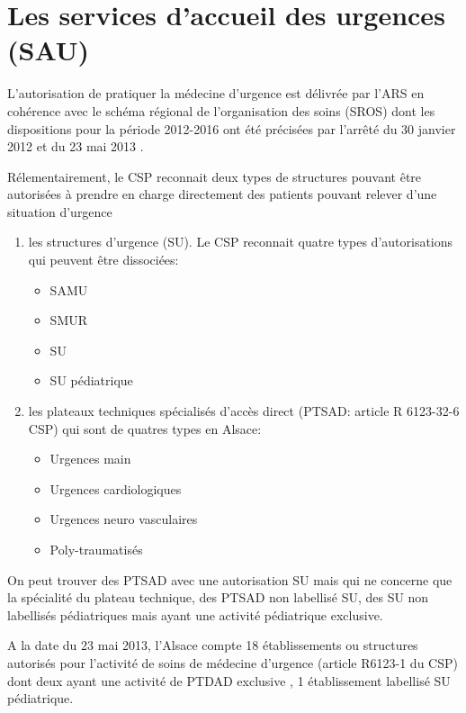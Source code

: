 \documentclass[12pt,english,french,twoside]{report}\usepackage[]{graphicx}\usepackage[]{color}
\begin{document}
\section{Les services d'accueil des urgences (SAU)}

L'autorisation de pratiquer la médecine d'urgence est délivrée par l'ARS en cohérence avec le schéma régional de l'organisation des soins (SROS) dont les dispositions pour la période 2012-2016 ont été précisées par l'arrêté du 30 janvier 2012 \cite{14} et du 23 mai 2013 \cite{15}.

Rélementairement, le CSP reconnait deux types de structures pouvant être autorisées à prendre en charge directement des patients pouvant relever d'une situation d'urgence
\begin{enumerate}
  \item les structures d'urgence (SU). Le CSP reconnait quatre types d'autorisations qui peuvent être dissociées:
    \begin{itemize}
      \item SAMU
      \item SMUR
      \item SU
      \item SU pédiatrique
    \end{itemize}

  \item les plateaux techniques spécialisés d'accès direct (PTSAD: article R 6123-32-6 CSP) qui sont de quatres types en Alsace:
    \begin{itemize}
      \item Urgences main
      \item Urgences cardiologiques
      \item Urgences neuro vasculaires
      \item Poly-traumatisés
    \end{itemize}
\end{enumerate}

On peut trouver des PTSAD avec une autorisation SU mais qui ne concerne que la spécialité du plateau technique, des PTSAD non labellisé SU, des SU non labellisés pédiatriques mais ayant une activité pédiatrique exclusive.

A la date du 23 mai 2013, l'Alsace compte 18 établissements ou structures autorisés pour l'activité de soins de médecine d'urgence (article R6123-1 du CSP) dont deux ayant une activité de PTDAD exclusive \cite{15}, 1 établissement labellisé SU pédiatrique.
\end{document}
